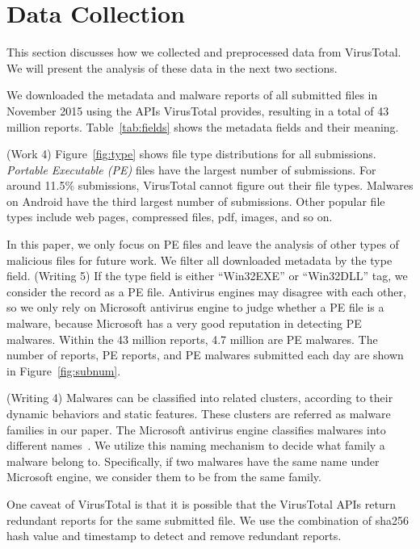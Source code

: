 
\section{Data Collection}
\label{sec:meth}

This section discusses how we collected and preprocessed data from VirusTotal.
We will present the analysis of these data in the next two sections.



We downloaded the metadata and malware reports of all submitted files in November 2015 using the APIs VirusTotal provides,
resulting in a total of 43 million reports.
Table~\ref{tab:fields} shows the metadata fields and their meaning. 

{\color{red} (Work 4)
Figure~\ref{fig:type} shows file type distributions for all submissions. 
{\em Portable Executable (PE)}  files have the largest number of submissions. 
For around 11.5\% submissions, VirusTotal cannot figure out their file types. 
Malwares on Android have the third largest number of submissions.  
Other popular file types include web pages, compressed files, pdf, images, and so on. 
}

In this paper, we only focus on PE files 
and leave the analysis of other types of malicious files for future work. 
We filter all downloaded metadata by the type field. 
{\color{red} (Writing 5)
If the type field is either ``Win32EXE'' or ``Win32DLL'' tag, we consider the record as a PE file. 
Antivirus engines may disagree with each other, so
we only rely on Microsoft antivirus engine to judge whether a PE file is a malware, because
Microsoft has a very good reputation in detecting PE malwares. 
}
Within the 43 million reports, 4.7 million are PE malwares. 
The number of reports, PE reports, and PE malwares submitted each day are shown in Figure~\ref{fig:subnum}.

{\color{red} (Writing 4)
Malwares can be classified into related clusters, according to their dynamic behaviors and static features. 
These clusters are referred as malware families in our paper. }
The Microsoft antivirus engine classifies malwares into different names~\cite{microsoft}. 
We utilize this naming mechanism to decide what family a malware belong to.
Specifically, if two malwares have the same name under Microsoft engine, we consider them to be from the same family.

One caveat of VirusTotal is that it is possible that the VirusTotal APIs return redundant reports 
for the same submitted file. 
We use the combination of sha256 hash value and timestamp to detect and remove redundant reports.

